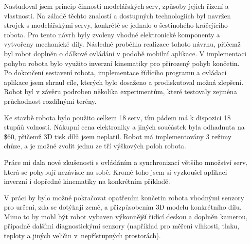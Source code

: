 Nastudoval jsem princip činnosti modelářských serv, způsoby jejich řízení a vlastnosti. Na záladě těchto znalostí a dostupných technologiích byl navržen strojek s modelářskými servy, konkrétě se jednalo o šestinohého kráčejícího robota. Pro tento návrh byly zvoleny vhodné elektronické komponenty a vytvořeny mechanické díly. Následně proběhla realizace tohoto návrhu, přičemž byl robot doplněn o dálkové ovládání v podobě mobilní aplikace. V implementaci pohybu robota bylo využito inverzní kinematiky pro přirozený pohyb končetin. Po dokončení sestavení robota, implementace řídícího programu a ovládací aplikace jsem shrnul cíle, kterých bylo dosaženo a prodiskutoval možná zlepšení. Robot byl v závěru podroben několika experimentům, které testovaly zejména průchodnost rozdílnými terény.

Ke stavbě robota bylo použito celkem 18 serv, tím pádem má k dispozici 18 stupňů volnosti. Nákupní cena elektroniky a jiných součástek byla odhadnuta na \$60, přičemž 3D tisk dílů jsem neplatil. Robot má implementovány 3 režimy chůze, a je možné zvolit jednu ze tří výškových poloh robota.

Práce mi dala nové zkušenosti s ovládáním a synchronizací většího množství serv, která se pohybují nezávisle na sobě. Kromě toho jsem si vyzkoušel aplikaci inverzní i dopředné kinematiky na konkrétním příkladě.

V práci by bylo možné pokračovat opatřením končetin robota vhodnými senzory pro určení, zda se dotýkají země, a přizpůsobením 3D modelu konkrétního dílu. Mimo to by mohl být robot vybaven výkonnější řídící deskou a doplněn kamerou, případně dalšími diagnostickými senzory (například pro měření vlhkosti, tlaku, teploty a jiných veličin v~nepřístupných prostorách).

